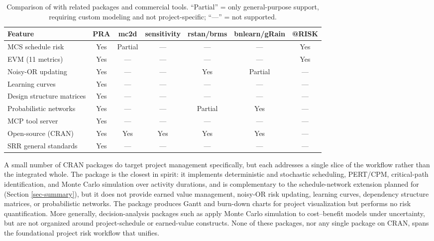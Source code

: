 \documentclass[
]{jss}
\begin{document}
\begin{table}

\caption{\label{tab:comparison-table}\label{tab:comparison}Comparison of  with related  packages and commercial tools. ``Partial'' = only general-purpose support, requiring custom modeling and not project-specific; ``---'' = not supported.}
\centering
\small
\begin{tabular}[t]{lcccccc}
\toprule
Feature & PRA & mc2d & sensitivity & rstan/brms & bnlearn/gRain & @RISK\\
\midrule
MCS schedule risk & Yes & Partial & --- & --- & --- & Yes\\
EVM (11 metrics) & Yes & --- & --- & --- & --- & Yes\\
Noisy-OR updating & Yes & --- & --- & Yes & Partial & ---\\
Learning curves & Yes & --- & --- & --- & --- & ---\\
Design structure matrices & Yes & --- & --- & --- & --- & ---\\
\addlinespace
Probabilistic networks & Yes & --- & --- & Partial & Yes & ---\\
MCP tool server & Yes & --- & --- & --- & --- & ---\\
Open-source (CRAN) & Yes & Yes & Yes & Yes & Yes & ---\\
SRR general standards & Yes & --- & --- & --- & --- & ---\\
\bottomrule
\end{tabular}
\end{table}

A small number of CRAN packages do target project management
specifically, but each addresses a single slice of the workflow rather
than the integrated whole. The  package
\citep{ProjectManagement} is the closest in spirit: it implements
deterministic and stochastic scheduling, PERT/CPM, critical-path
identification, and Monte Carlo simulation over activity durations, and
is complementary to the schedule-network extension planned for 
(Section \ref{sec-summary}), but it does not provide earned value
management, noisy-OR risk updating, learning curves, dependency
structure matrices, or probabilistic networks. The  package
\citep{plan} produces Gantt and burn-down charts for project
visualization but performs no risk quantification. More generally,
decision-analysis packages such as 
\citep{decisionSupport} apply Monte Carlo simulation to cost--benefit
models under uncertainty, but are not organized around project-schedule
or earned-value constructs. None of these packages, nor any single
package on CRAN, spans the foundational project risk workflow that
 unifies.
\end{document}
